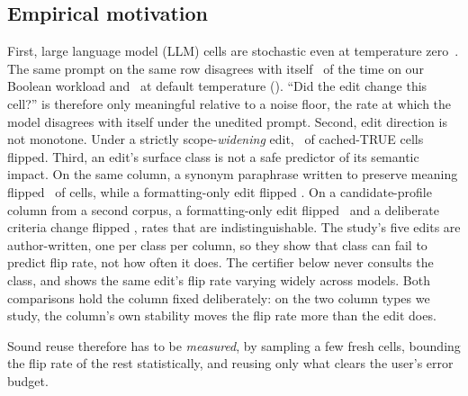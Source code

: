 \subsection{Empirical motivation}
First, large language model (LLM) cells are stochastic even at
temperature zero~\cite{ouyang,atil}. The same prompt on the same row
disagrees with itself \floorBool\ of the time on our Boolean workload and
\floorDefaultT\ at default temperature ().
``Did the edit change
this cell?'' is therefore only meaningful relative to a noise floor, the
rate at which the model disagrees with itself under the unedited
prompt. Second, edit direction is not monotone. Under a strictly
scope-\emph{widening} edit, \wideningTrueFlip\ of cached-TRUE cells
flipped. Third, an edit's surface class is not a safe
predictor of its semantic impact. On the same column, a synonym
paraphrase written to preserve meaning flipped \flipSoSynonym\ of cells,
while a formatting-only edit flipped \flipSoFormatting. On a candidate-profile column from a second corpus, a
formatting-only edit flipped \flipDjFormatting\ and a deliberate criteria change flipped
\flipDjCriteria, rates that are
indistinguishable. The study's five edits are author-written, one per class per
column, so they show that class can fail to predict flip rate, not how
often it does. The certifier below never consults the class, and
 shows the same edit's flip rate varying widely
across models. Both comparisons hold the column fixed
deliberately: on the two column types we study, the column's own
stability moves the flip rate more than the edit does.

Sound reuse therefore has to be \emph{measured}, by sampling a few
fresh cells, bounding the flip rate of the rest statistically, and
reusing only what clears the user's error budget.

\keepheading
